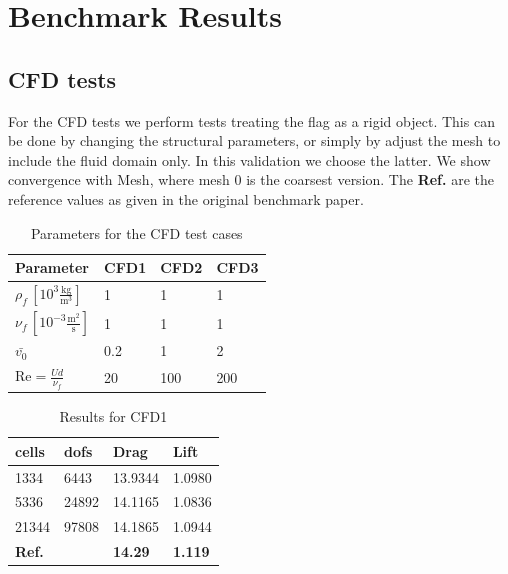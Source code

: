 \section{Benchmark Results}
\subsection{CFD tests}
For the CFD tests we perform tests treating the flag as a rigid object. This can be done by changing the structural parameters, or simply by adjust the mesh to include the fluid domain only. In this validation we choose the latter. We show convergence with Mesh, where mesh 0 is the coarsest version. The \textbf{Ref.} are the reference values as given in the original benchmark paper. 

\begin{table}[!ht]
\begin{center}
  \begin{tabular}{|l | l | l | l|} \hline
	Parameter & CFD1 & CFD2 & CFD3 \\ \hline
    $\rho_f\, [10^3\frac{\text{kg}}{\text{m}^3}]$  & 1 & 1 & 1 \\   \hline
    $\nu_f\, [10^{-3}\frac{\text{m}^2}{\text{s}}]$ & 1 & 1 & 1 \\ \hline
    $\bar{v_0}$ & 0.2 & 1 & 2   \\ \hline \hline
    $\text{Re} = \frac{Ud}{\nu_f}$ & 20 & 100 & 200 \\ \hline 
    \hline
  \end{tabular}
  \caption{Parameters for the CFD test cases}
\end{center}
\end{table}
\begin{table}[!ht]
\begin{center}
  \begin{tabular}{|l | l | l | l|} \hline
	cells & dofs & Drag & Lift \\ \hline
    1334  & 6443 & 13.9344 & 1.0980  \\   \hline
    5336 & 24892 & 14.1165 & 1.0836 \\ \hline
    21344 & 97808 & 14.1865 & 1.0944  \\ \hline \hline
    \textbf{Ref.}  & & \textbf{14.29} & \textbf{1.119} \\ \hline 
    \hline
  \end{tabular}
\end{center}
\caption{Results for CFD1}
\end{table}

